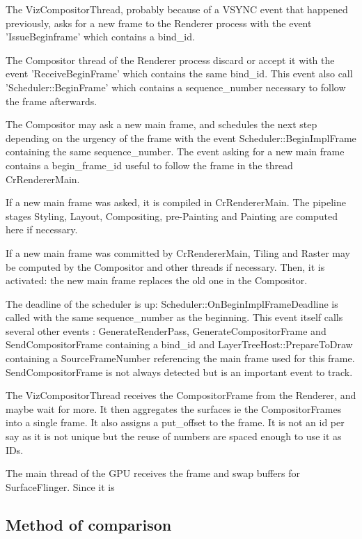 \item The VizCompositorThread, probably because of a VSYNC event that happened previously, asks for a new frame to the Renderer process with the event 'IssueBeginframe' which contains a bind\_id.
    \item The Compositor thread of the Renderer process discard or accept it with the event 'ReceiveBeginFrame' which contains the same bind\_id. This event also call 'Scheduler::BeginFrame' which contains a sequence\_number necessary to follow the frame afterwards.
    \item The Compositor may ask a new main frame, and schedules the next step depending on the urgency of the frame with the event Scheduler::BeginImplFrame containing the same sequence\_number. The event asking for a new main frame contains a begin\_frame\_id useful to follow the frame in the thread CrRendererMain.
    \item If a new main frame was asked, it is compiled in CrRendererMain. The pipeline stages Styling, Layout, Compositing, pre-Painting and Painting are computed here if necessary.
    \item If a new main frame was committed by CrRendererMain, Tiling and Raster may be computed by the Compositor and other threads if necessary. Then, it is activated: the new main frame replaces the old one in the Compositor.
    \item The deadline of the scheduler is up: Scheduler::OnBeginImplFrameDeadline is called with the same sequence\_number as the beginning. This event itself calls several other events : GenerateRenderPass, GenerateCompositorFrame and SendCompositorFrame containing a bind\_id and LayerTreeHost::PrepareToDraw containing a SourceFrameNumber referencing the main frame used for this frame. SendCompositorFrame is not always detected but is an important event to track.
    \item The VizCompositorThread receives the CompositorFrame from the Renderer, and maybe wait for more. It then aggregates the surfaces ie the CompositorFrames into a single frame. It also assigns a put\_offset to the frame. It is not an id per say as it is not unique but the reuse of numbers are spaced enough to use it as IDs.
    \item The main thread of the GPU receives the frame and swap buffers for SurfaceFlinger. Since it is 
    
    \subsection{Method of comparison}
    
